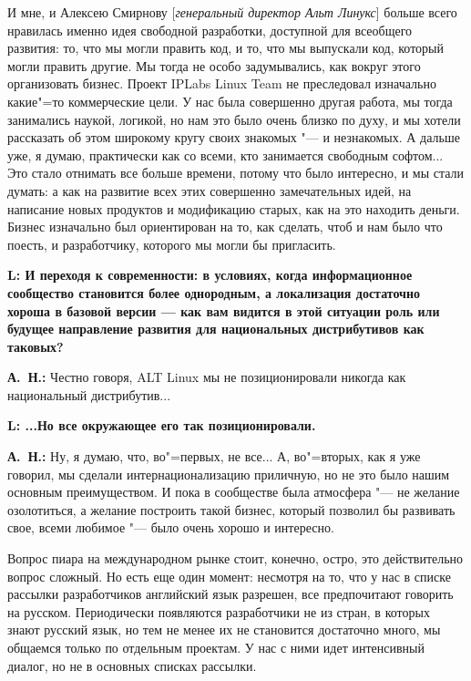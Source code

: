 \documentclass[10pt, a5paper]{article}
\begin{document}
И мне, и Алексею Смирнову [\emph{генеральный директор Альт Линукс}]  больше всего нравилась именно идея свободной разработки, доступной для всеобщего развития: то, что мы могли править код, и то, что мы выпускали код, который могли править другие. Мы тогда не особо задумывались, как вокруг этого организовать бизнес. Проект  IPLabs Linux Team не преследовал изначально какие"=то коммерческие цели. У нас была  совершенно другая работа, мы тогда занимались наукой, логикой, но нам это было очень близко по духу, и мы хотели рассказать об этом широкому кругу своих знакомых "--- и незнакомых. А дальше уже, я думаю, практически как со всеми, кто занимается свободным софтом... Это стало отнимать все больше времени, потому что было интересно, и мы стали думать: а как на развитие всех этих совершенно замечательных идей, на написание новых продуктов и модификацию старых, как на это находить деньги. Бизнес изначально был ориентирован на то, как сделать, чтоб и нам было что поесть, и разработчику, которого мы могли бы пригласить. 

{\noindent \bf L: И переходя к современности: в условиях, когда информационное сообщество становится более однородным, а локализация  достаточно хороша в базовой версии — как вам видится в этой ситуации роль или будущее направление развития для национальных дистрибутивов как таковых?}

{\noindent \bf А.~Н.:} Честно говоря, ALT Linux мы не позиционировали никогда как национальный дистрибутив...
 
{\noindent \bf L: ...Но все окружающее его так позиционировали.}

{\noindent \bf А.~Н.:} Ну, я думаю, что, во"=первых, не все... А, во"=вторых, как я уже говорил, мы сделали интернационализацию приличную, но не это было нашим основным преимуществом. И пока в сообществе была атмосфера "--- не желание озолотиться, а желание построить такой бизнес, который позволил бы развивать свое, всеми любимое "--- было очень хорошо и интересно.

Вопрос пиара на международном рынке стоит, конечно, остро, это действительно вопрос сложный. Но есть еще один момент: несмотря на то, что у нас в списке рассылки разработчиков английский язык разрешен, все предпочитают говорить на русском. Периодически появляются разработчики не из стран, в которых знают русский язык, но тем не менее их не становится достаточно много, мы общаемся только по отдельным проектам. У нас с ними идет интенсивный диалог, но не в основных списках рассылки. 
\end{document}

